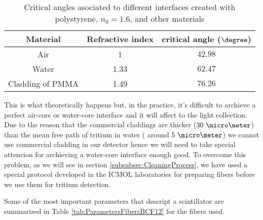 \begin{table}[htbp]
\begin{center}
\begin{tabular}{|c|c|c|}
\hline
Material & Refractive index & critical angle ($\degree$) \\
\hline \hline \hline
Air & 1 & $42.98$ \\ \hline
Water & 1.33 & $62.47$ \\ \hline
Cladding of PMMA & 1.49 & $76.26$ \\ \hline
\end{tabular}
\caption{Critical angles asociated to different interfaces created with polystyrene, $n_0=1.6$, and other materials}
\label{tab:CriticalAngles}
\end{center}
\end{table}

This is what theoretically happens but, in the practice, it's difficult to archieve a perfect air-core or water-core interface and it will affect to the light collection. Due to the reason that the commercial claddings are thicker ($30~\micro \meter$) than the mean free path of tritium in water ( around $5~\micro\meter$) we cannot use commercial cladding in our detector hence we will need to take special attencion for archieving a water-core interface enough good. To overcome this problem, as we will see in section \ref{subsubsec:CleaningProcess}, we have used a special protocol developed in the ICMOL laboratories for preparing fibers before we use them for tritium detection.

Some of the most important parameters that descript a scintillator are summarized in Table \ref{tab:ParametersFibersBCF12} for the fibers used.

